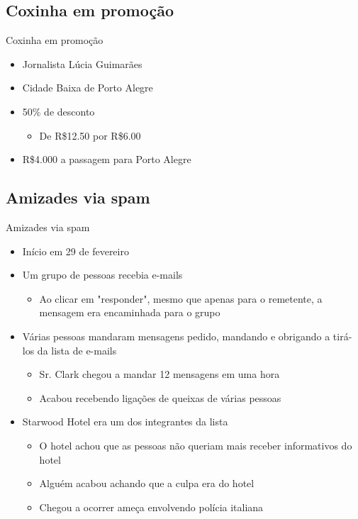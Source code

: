 \documentclass[dvipdfm]{beamer}
\begin{document}
\subsection{Coxinha em promoção}
\begin{frame}{Coxinha em promoção}
	\begin{itemize}
		\item Jornalista Lúcia Guimarães
		\item Cidade Baixa de Porto Alegre
		\item 50\% de desconto
		\begin{itemize}
			\item De R\$12.50 por R\$6.00
		\end{itemize}
		\item R\$4.000 a passagem para Porto Alegre
	\end{itemize}
\end{frame}

\subsection{Amizades via spam}
\begin{frame}{Amizades via spam}
	\begin{itemize}
		\item Início em 29 de fevereiro
		\item Um grupo de pessoas recebia e-mails
		\begin{itemize}
			\item Ao clicar em "responder", mesmo que apenas para o remetente, a mensagem era encaminhada para o grupo
		\end{itemize}
		\item Várias pessoas mandaram mensagens pedido, mandando e obrigando a tirá-los da lista de e-mails
		\begin{itemize}
			\item Sr. Clark chegou a mandar 12 mensagens em uma hora
			\item Acabou recebendo ligações de queixas de várias pessoas
		\end{itemize}
		\item Starwood Hotel era um dos integrantes da lista
		\begin{itemize}
			\item O hotel achou que as pessoas não queriam mais receber informativos do hotel
			\item Alguém acabou achando que a culpa era do hotel
			\item Chegou a ocorrer ameça envolvendo polícia italiana
		\end{itemize}
	\end{itemize}
\end{frame}
\end{document}
